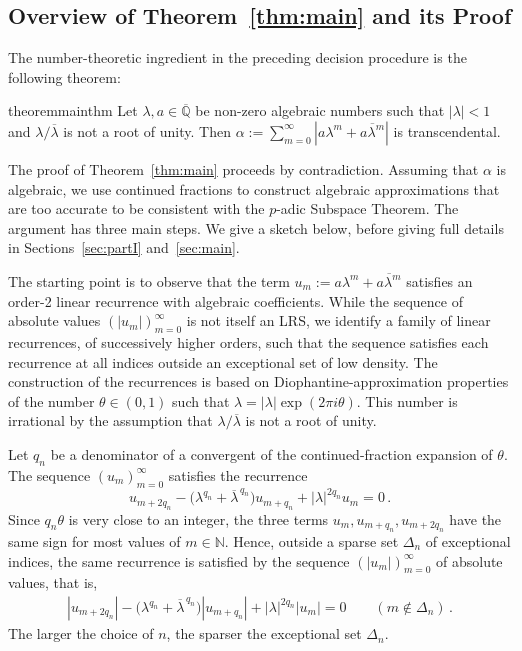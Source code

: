 \documentclass[a4paper,UKenglish,cleveref, autoref, thm-restate]{lipics-v2021}
\begin{document}
\subsection{Overview of Theorem~\ref{thm:main} and its Proof}
The number-theoretic ingredient in the preceding decision procedure is
the following theorem:
%
\begin{restatable}{theorem}{mainthm}
Let $\lambda,a\in\overline{\mathbb Q}$ be non-zero algebraic numbers
such that $|\lambda|<1$ and
$\lambda/\overline{\lambda}$ is not a root of unity. Then
\(
    \alpha
    :=
    \sum_{m=0}^{\infty}
    \left|a\lambda^m+\overline{a\lambda^m}\right|
\)
is transcendental.
\label{thm:main}
\end{restatable}

The proof of Theorem~\ref{thm:main} proceeds by contradiction. Assuming that $\alpha$ is
algebraic, we use continued fractions to construct algebraic
approximations that are too accurate to be consistent with the
$p$-adic Subspace Theorem. The argument has three main steps.  We give a sketch below, before
giving full details in Sections~\ref{sec:partI} and~\ref{sec:main}.

The starting point is to observe that the term
$u_m:=a\lambda^m + \overline{a\lambda^m} $ satisfies an order-2 linear
recurrence with algebraic coefficients.  While the sequence 
of absolute values
$(|u_m|)_{m=0}^\infty$ is
not itself an LRS, we identify a family of linear
recurrences, of successively higher orders, such that the sequence satisfies each recurrence at
all indices outside an exceptional set of low density.
The construction of the recurrences is based
on Diophantine-approximation properties of the number $\theta \in (0,1)$
such that $\lambda = |\lambda|\exp(2\pi i \theta)$.  This number is irrational  
by the assumption that $\lambda/\overline{\lambda}$ is not a root of unity.

Let $q_n$ be a denominator of a convergent of the continued-fraction
expansion of $\theta$. The sequence $(u_m)_{m=0}^\infty$ satisfies the 
recurrence
\[
    u_{m+2q_n}
    -
    \bigl(\lambda^{q_n}+\overline{\lambda}^{\,q_n}\bigr)
    u_{m+q_n}
    +
    |\lambda|^{2q_n}u_m
    =
    0\, .
\]
Since $q_n\theta$ is very close to an integer, the three terms
$u_m,u_{m+q_n},u_{m+2q_n}$ have the same sign for most values of $m\in\mathbb N$.  Hence, outside
a sparse set $\Delta_n$ of exceptional indices,
the same recurrence is satisfied by the sequence $(|u_m|)_{m=0}^\infty$ of absolute values, that is,
\begin{gather}
|u_{m+2q_n}|
    -
    \bigl(\lambda^{q_n}+\overline{\lambda}^{\,q_n}\bigr)
    |u_{m+q_n}|
    +
    |\lambda|^{2q_n}|u_m|
    =
    0 \qquad (m\not\in\Delta_n)\, .
\label{eq:recur-with-error}
\end{gather}
The larger the choice of $n$, the sparser the exceptional set $\Delta_n$.
\end{document}
